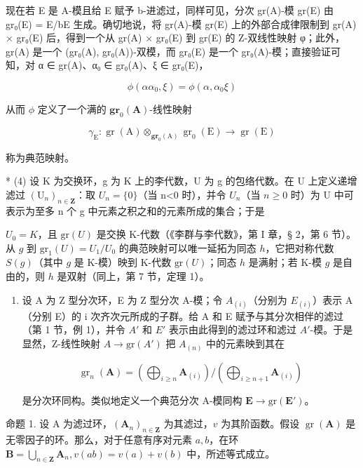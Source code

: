 现在若 E 是 A-模且给 E 赋予 b-进滤过，同样可见，分次 gr(A)-模 gr(E) 由 gr₀(E) = E/bE 生成。确切地说，将 gr(A)-模 gr(E) 上的外部合成律限制到 gr(A) × gr₀(E) 后，得到一个从 gr(A) × gr₀(E) 到 gr(E) 的 Z-双线性映射 φ；此外，gr(A) 是一个 (gr₀(A), gr₀(A))-双模，而 gr₀(E) 是一个 gr₀(A)-模；直接验证可知，对 α ∈ gr(A)、α₀ ∈ gr₀(A)、ξ ∈ gr₀(E)，

\[
\phi (\alpha \alpha_ {0}, \xi) = \phi (\alpha , \alpha_ {0} \xi)
\]

从而 \(\phi\) 定义了一个满的 \(\mathbf{gr}_0(\mathbf{A})\)-线性映射

\[
\gamma_ {\mathrm{E}} \colon \operatorname{gr} (\mathrm{A}) \otimes_ {\mathbf {g r} _ {0} (\mathrm{A})} \operatorname{gr} _ {0} (\mathrm{E}) \rightarrow \operatorname{gr} (\mathrm{E})\tag{11}
\]

称为典范映射。

	* (4) 设 K 为交换环，g 为 K 上的李代数，U 为 g 的包络代数。在 U 上定义递增滤过 \((\mathrm{U}_{n})_{n\in\mathbf{Z}}\)：取 \(U_{n}=\{0\}\)（当 n\textless0 时），并令 \(U_{n}\)（当 \(n\geqslant0\) 时）为 U 中可表示为至多 n 个 g 中元素之积之和的元素所成的集合；于是

	\(U_{0} = K\)，且 \(\text{gr}(U)\) 是交换 K-代数（《李群与李代数》，第 I 章，§ 2，第 6 节）。从 \(g\) 到 \(\text{gr}_{1}(U) = U_{1}/U_{0}\) 的典范映射可以唯一延拓为同态 \(h\)，它把对称代数 \(S(g)\)（其中 \(g\) 是 K-模）映到 K-代数 \(\text{gr}(U)\)；同态 \(h\) 是满射；若 K-模 \(g\) 是自由的，则 \(h\) 是双射（同上，第 7 节，定理 1）。

\begin{enumerate}
\def\labelenumi{(\arabic{enumi})}
\setcounter{enumi}{4}
\tightlist
\item
  设 A 为 Z 型分次环，E 为 Z 型分次 A-模；令 \(A_{(i)}\)（分别为 \(E_{(i)}\)）表示 A（分别 E）的 i 次齐次元所成的子群。给 A 和 E 赋予与其分次相伴的滤过（第 1 节，例 1），并令 \(A'\) 和 \(E'\) 表示由此得到的滤过环和滤过 \(A'\)-模。于是显然，Z-线性映射 \(A \to \text{gr}(A')\) 把 \(A_{(n)}\) 中的元素映到其在

\[
\operatorname{gr} _ {n} (\mathbf {A}) = \left(\bigoplus_ {i \geqslant n} \mathbf {A} _ {(i)}\right) / \left(\bigoplus_ {i \geqslant n + 1} \mathbf {A} _ {(i)}\right)
\]

是分次环同构。类似地定义一个典范分次 A-模同构 \(\mathbf{E} \to \mathrm{gr}(\mathbf{E}')\)。
\end{enumerate}

	命题 1. 设 A 为滤过环，\((\mathbf{A}_n)_{n\in \mathbf{Z}}\) 为其滤过，\(v\) 为其阶函数。假设 \(\operatorname {gr}(\mathbf{A})\) 是无零因子的环。那么，对于任意有序对元素 \(a,b\)，在环 \(\mathbf{B} = \bigcup_{n\in \mathbf{Z}}\mathbf{A}_n,v(ab) = v(a) + v(b)\) 中，所述等式成立。

